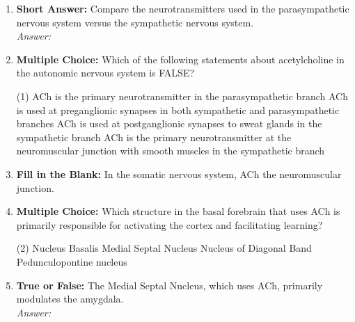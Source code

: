 \begin{enumerate}[label=\textbf{Q3.4.\arabic*}]
    \item \textbf{Short Answer:} Compare the neurotransmitters used in the parasympathetic nervous system versus the sympathetic nervous system. \\
        \textit{Answer:} %

    \item \textbf{Multiple Choice:} Which of the following statements about acetylcholine in the autonomic nervous system is FALSE?
        \begin{tasks}[label=\textcolor{\documentTheme}{(\Alph*)}, item-format=\color{\documentTheme}, label-width=1.5em, item-indent=1.7em](1)
            \task ACh is the primary neurotransmitter in the parasympathetic branch
            \task ACh is used at preganglionic synapses in both sympathetic and parasympathetic branches
            \task ACh is used at postganglionic synapses to sweat glands in the sympathetic branch
            \task ACh is the primary neurotransmitter at the neuromuscular junction with smooth muscles in the sympathetic branch
        \end{tasks}

    \item \textbf{Fill in the Blank:} In the somatic nervous system, ACh \underline{\hspace{3cm}} the neuromuscular junction.

    \item \textbf{Multiple Choice:} Which structure in the basal forebrain that uses ACh is primarily responsible for activating the cortex and facilitating learning?
        \begin{tasks}[label=\textcolor{\documentTheme}{(\Alph*)}, item-format=\color{\documentTheme}, label-width=1.5em, item-indent=1.7em](2)
            \task Nucleus Basalis
            \task Medial Septal Nucleus
            \task Nucleus of Diagonal Band
            \task Pedunculopontine nucleus
        \end{tasks}

    \item \textbf{True or False:} The Medial Septal Nucleus, which uses ACh, primarily modulates the amygdala. \\
        \textit{Answer:} %


\end{enumerate}
